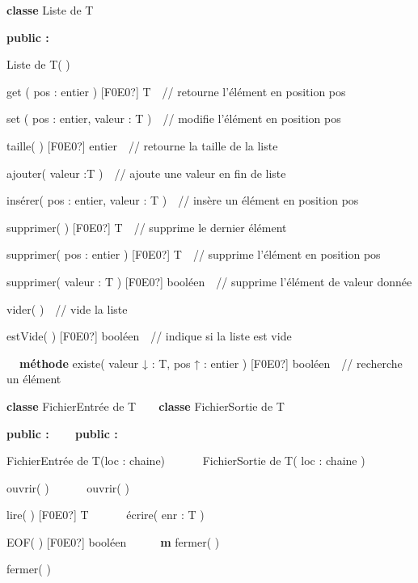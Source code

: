 {\sffamily
\textbf{classe} Liste de T}

{\sffamily\bfseries
public :}

{\sffamily
{} Liste de T( )}

{\sffamily
{} get ( pos : entier ) \textrm{[F0E0?]}
T\ \ // retourne l’élément en position pos}

{\sffamily
{} set ( pos : entier, valeur : T )\ \ //
modifie l’élément en position pos}

{\sffamily
{} taille( ) \textrm{[F0E0?]} entier\ \ //
retourne la taille de la liste}

{\sffamily
{} ajouter( valeur :T )\ \ // ajoute une
valeur en fin de liste}

{\sffamily
{} insérer( pos : entier, valeur : T )\ \ //
insère un élément en position pos}

{\sffamily
{} supprimer( ) \textrm{[F0E0?]} T\ \ //
supprime le dernier élément}

{\sffamily
{} supprimer( pos : entier ) \textrm{[F0E0?]}
T\ \ // supprime l’élément en position pos}

{\sffamily
{} supprimer( valeur : T ) \textrm{[F0E0?]}
booléen\ \ // supprime l’élément de valeur donnée}

{\sffamily
{} vider( )\ \ // vide la liste}

{\sffamily
{} estVide( ) \textrm{[F0E0?]} booléen\ \ //
indique si la liste est vide}

{\sffamily
\textbf{\ \ méthode} existe( valeur
{↓}{ :} T, pos
{↑} : entier ) \textrm{[F0E0?]} booléen\ \ //
recherche un élément}

{\sffamily
{}}


\bigskip

{\sffamily
\textbf{classe} FichierEntrée de T\ \ \ \ \textbf{classe} FichierSortie
de T}

{\sffamily\bfseries
public :\ \ \ \ public :}

{\sffamily
{} FichierEntrée de T(loc :
chaine)\ \ \ \ \ \  FichierSortie de T(
loc : chaine )}

{\sffamily
{} ouvrir(
)\ \ \ \ \ \  ouvrir( )}

{\sffamily
{} lire( ) \textrm{[F0E0?]}
T\ \ \ \ \ \  écrire( enr : T )}

{\sffamily
{} EOF( ) \textrm{[F0E0?]}
booléen\ \ \ \ \ \ \textbf{m} fermer( )}

{\sffamily
{} fermer( )\ \ \ \ }

{\sffamily
{}}
